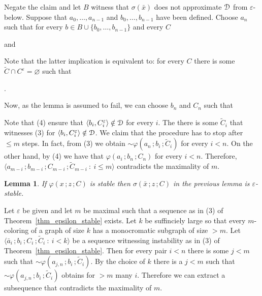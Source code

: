 \documentclass{amsproc}
\makeatletter
\newcounter{thm}
\theoremstyle{mio}
\newtheorem{lemma}[thm]{Lemma}\tcolorboxenvironment{lemma}{mythm}
\providecommand{\proofNameStyle}{\bfseries}
\renewenvironment{proof}[1][\proofname]{\par
  \pushQED{\qed}%
  \normalfont%
  \trivlist
  \item[\hskip\labelsep
        \proofNameStyle
    #1\@addpunct{.}]\ignorespaces
}{%
  \popQED\endtrivlist\@endpefalse
}
\makeatother
\begin{document}
\begin{proof}
  Negate the claim and let $B$ witness that $\sigma(\bar x)$ does not approximate ${\EuScript D}$ from $\varepsilon$-below.
  Suppose that $a_0,\dots,a_{n-1}$ and $b_0,\dots,b_{n-1}$ have been defined.
  Choose $a_n$ such that for every $b\in B\cup\{b_0,\dots,b_{n-1}\}$ and every $C$

  \quad and

  
  Note that the latter implication is equivalent to: for every $C$ there is some  $\tilde C\cap C^\varepsilon=\varnothing$ such that 
  
  .%

  Now, as the lemma is assumed to fail, we can choose $b_n$ and $C_n$ such that


  Note that (4) ensure that $\langle b_i,C_i^\varepsilon\rangle\notin{\EuScript D}$ for every $i$.
  The there is some $\tilde C_i$ that witnesses (3) for $\langle b_i,C_i^\varepsilon\rangle\notin{\EuScript D}$.
  We claim that the procedure has to stop after $\le m$ steps. 
  In fact, from (3) we obtain ${\sim}\varphi(a_n\,;b_i\,;\tilde C_i)$ for every $i<n$.
  On the other hand, by (4) we have that $\varphi(a_i\,;b_n\,;C_n)$ for every $i<n$.
  Therefore, $\langle a_{m-i}\,;b_{m-i}\,;C_{m-i}\,;\tilde C_{m-i}\ :\ i\le m\rangle$ contradicts the maximality of $m$.
\end{proof}

\begin{lemma}\label{lem_sigma_stable}
  If $\varphi(x\,;z\,;C)$ is stable then $\sigma(\bar x\,;z\,;C)$ in the previous lemma is $\varepsilon$-stable.
\end{lemma}

\begin{proof}
  Let $\varepsilon$ be given and let $m$ be maximal such that a sequence as in (3) of Theorem~\ref{thm_epsilon_stable} exists.
  Let $k$ be suffinciely large so that every $m$-coloring of a graph of size $k$ has a monocromatic subgraph of size $>m$.
  Let $\langle \bar a_i\,;b_i\,;C_i\,;\tilde C_i\ :\ i<k\rangle$ be a sequence witnessing instability as in (3) of Theorem~\ref{thm_epsilon_stable}.
  Then for every pair $i<n$ there is some $j<m$ such that ${\sim}\varphi(a_{j,n}\,;b_i\,;\tilde C_i)$.
  By the choice of $k$ there is a $j<m$ such that ${\sim}\varphi(a_{j,n}\,;b_i\,;\tilde C_i)$ obtains for $>m$ many $i$.
  Therefore we can extract a subsequence that contradicts the maximality of $m$.
\end{proof}
\end{document}
